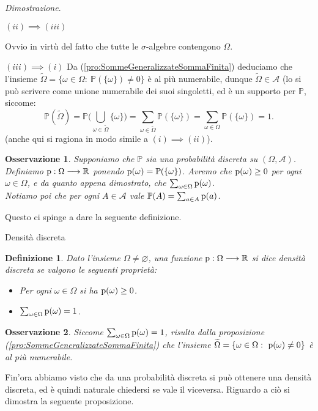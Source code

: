 \documentclass[11pt]{book}
\makeatletter
\theoremstyle{Definizione}
\newtheorem*{mydef}{Definizione}
\theoremstyle{TeoremaProposizioneLemmaCorollario}
\theoremstyle{OsservazioneNota}
\newtheorem{myobs}{Osservazione}[section]
\renewenvironment{proof}[1][\proofname]{\par
  \normalfont \topsep6\p@\@plus6\p@\relax
  \trivlist
  \item[\hskip\labelsep
        \itshape
    #1\@addpunct{.}]\ignorespaces
}{%
  \endtrivlist\@endpefalse
}
\newcommand{\R}{\mathbb{R}}
\renewcommand{\P}{\mathbb{P}}
\newcommand{\p}{\textup{p}}
\renewenvironment{proof}{\textsl{Dimostrazione}.}{}
\makeatother
\begin{document}
\begin{boxpro}
\begin{proof}
\begin{flushleft}
$(ii) \implies (iii)$
\end{flushleft}
Ovvio in virtù del fatto che tutte le $\sigma$-algebre contengono $\Omega$.
\begin{flushleft}
$(iii) \implies (i)$
Da (\ref{pro:SommeGeneralizzateSommaFinita}) deduciamo che l'insieme $\widetilde{\Omega} = \{\omega\in \Omega:\ \P(\{\omega\}) \neq 0\}$ è al più numerabile, dunque $\widetilde{\Omega}\in \mathcal{A}$ (lo si può scrivere come unione numerabile dei suoi singoletti, ed è un supporto per $\P$, siccome:
$$
\P(\widetilde{\Omega}) = \P\Bigg(\bigcup_{\omega\in \widetilde{\Omega} }\{\omega\}\Bigg) = \sum_{\omega\in \widetilde{\Omega}} \P(\{\omega\}) = \sum_{\omega\in \Omega} \P(\{\omega\}) = 1.
$$
(anche qui si ragiona in modo simile a $(i)\implies(ii)$).
\end{flushleft}
\end{proof}
\end{boxpro}
\begin{myobs}
Supponiamo che $\P$ sia una probabilità discreta su $(\Omega,\mathcal{A})$. Definiamo $\p: \Omega \longrightarrow \R$ ponendo $\p(\omega) = \P(\{\omega\})$. Avremo che $\p(\omega) \geq 0$ per ogni $\omega \in \Omega$, e da quanto appena dimostrato, che $\sum_{\omega\in \Omega} \p(\omega)$.\\
Notiamo poi che per ogni $A\in \mathcal{A}$ vale $\P(A) = \sum_{a\in A} \p(a)$.
\end{myobs}
Questo ci spinge a dare la seguente definizione.
\begin{boxdef}{Densità discreta}
\begin{mydef}
Dato l'insieme $\Omega\neq \varnothing$, una funzione $\p:\Omega\longrightarrow \R$ si dice densità discreta se valgono le seguenti proprietà:
\begin{itemize}
\item[$(i)$] Per ogni $\omega\in \Omega$ si ha $\p(\omega) \geq 0$.
\item[$(ii)$] $\sum_{\omega\in \Omega}\p(\omega) = 1$.
\end{itemize}
\end{mydef}
\end{boxdef}
\begin{myobs}
Siccome $\sum_{\omega\in \Omega} \p(\omega) = 1$, risulta dalla proposizione (\ref{pro:SommeGeneralizzateSommaFinita}) che l'insieme $\widetilde{\Omega} = \{\omega\in \Omega:\ \p(\omega) \neq 0\}$ è al più numerabile.
\end{myobs}
Fin'ora abbiamo visto che da una probabilità discreta si può ottenere una densità discreta, ed è quindi naturale chiedersi se vale il viceversa. Riguardo a ciò si dimostra la seguente proposizione.
\end{document}
